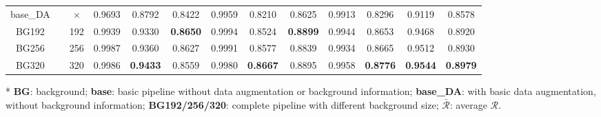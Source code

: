 \documentclass[letterpaper, 10 pt, conference]{ieeeconf}  %
\begin{document}
\begin{table}
\begin{threeparttable}
\begin{tabular}{ccc|ccc|ccc|ccc!{\color{black}\vrule}c}
			base\_DA               & \checkmark                          & $\times$                          & 0.9693 & {}0.8792          & {}0.8422              & 0.9959 & {}0.8210          & {}0.8625          & 0.9913 & {}0.8296              & {}0.9119              & {}0.8578           \\
			BG192                  & \checkmark                          & 192                         & 0.9939 & {}0.9330          & {}\textbf{0.8650}  & 0.9994 & {}0.8524           & {}\textbf{0.8899}  & 0.9944 & {}0.8653           & {}0.9468            & {}0.8920           \\
			BG256                  & \checkmark                          & 256                         & 0.9987 & {}0.9360          & {}0.8627          & 0.9991 & {}0.8577          & {}0.8839           & 0.9934 & {}0.8665           & {}0.9512          & {}0.8930           \\
			BG320                  & \checkmark                          & 320                         & 0.9986 & {}\textbf{0.9433}  & {}0.8559          & 0.9980 & {}\textbf{0.8667}  & {}0.8895           & 0.9958 & {}\textbf{0.8776}  & {}\textbf{0.9544}  & {}\textbf{0.8979}   \\
			\hline
		\end{tabular}
		\begin{tablenotes}
			\footnotesize
			\item[*] \textbf{BG}: background; \textbf{base}: basic pipeline without data augmentation or background information; \textbf{base\_DA}: with basic data augmentation, without background information; \textbf{BG192/256/320}: complete pipeline with different background size; \textbf{$\bar{\mathcal{R}}$}: average $\mathcal{R}$.
		\end{tablenotes}
	\end{threeparttable}
\end{table}
\end{document}
